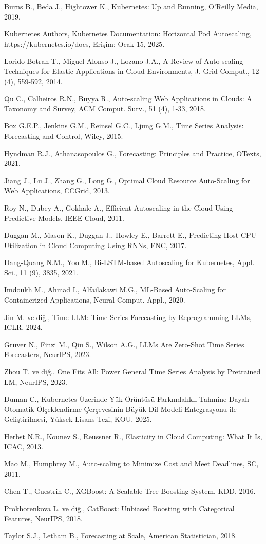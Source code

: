 \begin{enumerate}[label={[\arabic*]}]
\item Burns B., Beda J., Hightower K., Kubernetes: Up and Running, O'Reilly Media, 2019.
\item Kubernetes Authors, Kubernetes Documentation: Horizontal Pod Autoscaling, https://kubernetes.io/docs, Erişim: Ocak 15, 2025.
\item Lorido-Botran T., Miguel-Alonso J., Lozano J.A., A Review of Auto-scaling Techniques for Elastic Applications in Cloud Environments, J. Grid Comput., 12 (4), 559-592, 2014.
\item Qu C., Calheiros R.N., Buyya R., Auto-scaling Web Applications in Clouds: A Taxonomy and Survey, ACM Comput. Surv., 51 (4), 1-33, 2018.
\item Box G.E.P., Jenkins G.M., Reinsel G.C., Ljung G.M., Time Series Analysis: Forecasting and Control, Wiley, 2015.
\item Hyndman R.J., Athanasopoulos G., Forecasting: Principles and Practice, OTexts, 2021.
\item Jiang J., Lu J., Zhang G., Long G., Optimal Cloud Resource Auto-Scaling for Web Applications, CCGrid, 2013.
\item Roy N., Dubey A., Gokhale A., Efficient Autoscaling in the Cloud Using Predictive Models, IEEE Cloud, 2011.
\item Duggan M., Mason K., Duggan J., Howley E., Barrett E., Predicting Host CPU Utilization in Cloud Computing Using RNNs, FNC, 2017.
\item Dang-Quang N.M., Yoo M., Bi-LSTM-based Autoscaling for Kubernetes, Appl. Sci., 11 (9), 3835, 2021.
\item Imdoukh M., Ahmad I., Alfailakawi M.G., ML-Based Auto-Scaling for Containerized Applications, Neural Comput. Appl., 2020.
\item Jin M. ve diğ., Time-LLM: Time Series Forecasting by Reprogramming LLMs, ICLR, 2024.
\item Gruver N., Finzi M., Qiu S., Wilson A.G., LLMs Are Zero-Shot Time Series Forecasters, NeurIPS, 2023.
\item Zhou T. ve diğ., One Fits All: Power General Time Series Analysis by Pretrained LM, NeurIPS, 2023.
\item Duman C., Kubernetes Üzerinde Yük Örüntüsü Farkındalıklı Tahmine Dayalı Otomatik Ölçeklendirme Çerçevesinin Büyük Dil Modeli Entegrasyonu ile Geliştirilmesi, Yüksek Lisans Tezi, KOU, 2025.
\item Herbst N.R., Kounev S., Reussner R., Elasticity in Cloud Computing: What It Is, ICAC, 2013.
\item Mao M., Humphrey M., Auto-scaling to Minimize Cost and Meet Deadlines, SC, 2011.
\item Chen T., Guestrin C., XGBoost: A Scalable Tree Boosting System, KDD, 2016.
\item Prokhorenkova L. ve diğ., CatBoost: Unbiased Boosting with Categorical Features, NeurIPS, 2018.
\item Taylor S.J., Letham B., Forecasting at Scale, American Statistician, 2018.

\end{enumerate}

